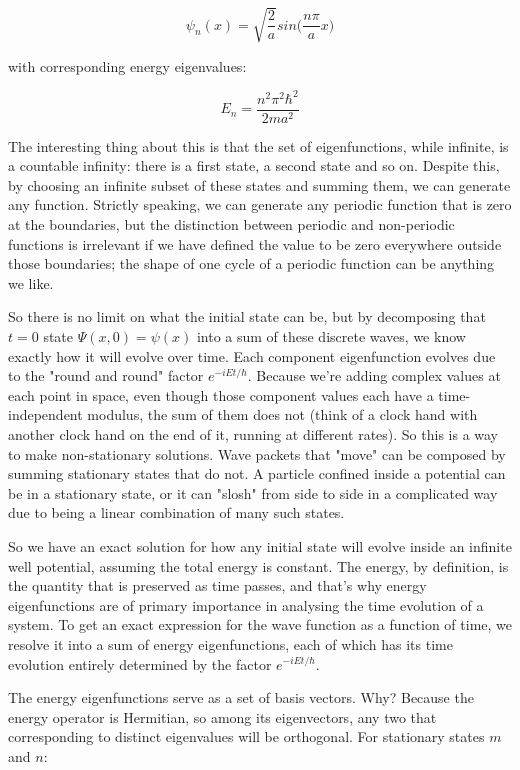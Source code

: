 $$
\psi_n(x) =
\sqrt{\frac{2}{a}} sin \lparen \frac{n\pi}{a} x\rparen
$$

with corresponding energy eigenvalues:

$$
E_n = \frac{n^2\pi^2\hbar^2}{2ma^2}
$$

The interesting thing about this is that the set of eigenfunctions, while infinite, is a countable infinity: there is a first state, a second state and so on. Despite this, by choosing an infinite subset of these states and summing them, we can generate any function. Strictly speaking, we can generate any periodic function that is zero at the boundaries, but the distinction between periodic and non-periodic functions is irrelevant if we have defined the value to be zero everywhere outside those boundaries; the shape of one cycle of a periodic function can be anything we like.

So there is no limit on what the initial state can be, but by decomposing that $t = 0$ state $\Psi(x, 0) = \psi(x)$ into a sum of these discrete waves, we know exactly how it will evolve over time. Each component eigenfunction evolves due to the "round and round" factor $e^{-iEt/\hbar}$. Because we're adding complex values at each point in space, even though those component values each have a time-independent modulus, the sum of them does not (think of a clock hand with another clock hand on the end of it, running at different rates). So this is a way to make non-stationary solutions. Wave packets that "move" can be composed by summing stationary states that do not. A particle confined inside a potential can be in a stationary state, or it can "slosh" from side to side in a complicated way due to being a linear combination of many such states.

So we have an exact solution for how any initial state will evolve inside an infinite well potential, assuming the total energy is constant. The energy, by definition, is the quantity that is preserved as time passes, and that's why energy eigenfunctions are of primary importance in analysing the time evolution of a system. To get an exact expression for the wave function as a function of time, we resolve it into a sum of energy eigenfunctions, each of which has its time evolution entirely determined by the factor $e^{-iEt/\hbar}$.

The energy eigenfunctions serve as a set of basis vectors. Why? Because the energy operator is Hermitian, so among its eigenvectors, any two that corresponding to distinct eigenvalues will be orthogonal. For stationary states $m$ and $n$:

